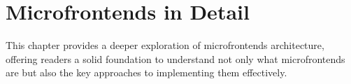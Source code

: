 \chapter{Microfrontends in Detail}
\label{chap:MicrofrontendsInDetail}
This chapter provides a deeper exploration of microfrontends architecture, offering readers a solid foundation to understand not only what microfrontends are but also the key approaches to implementing them effectively.

